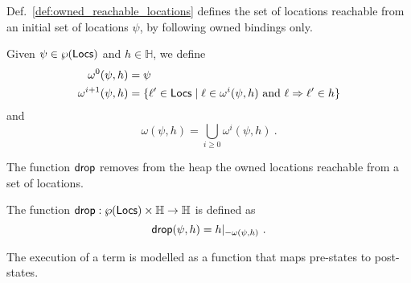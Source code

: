 Def.~\ref{def:owned_reachable_locations}
defines the set of locations reachable from an initial set of locations $\psi$,
by following owned bindings only.
%
\begin{definition}\label{def:owned_reachable_locations}
  Given $\psi\in\wp(\mathsf{Locs})$ and $h\in\mathbb{H}$, we define
  \begin{align*}
  \omega^0(\psi,h)&=\psi\\ %
  \omega^{i+1}(\psi,h)&=\{\ell'\in\Locs\mid\ell\in\omega^i(\psi,h)\text{ and }\ell\Rightarrow\ell'\in h\}
  \end{align*}
  and
  \[
  \omega(\psi,h)=\bigcup\limits_{i\ge 0}\omega^i(\psi,h)~.
  \]
\end{definition}

\noindent
The function $\mathsf{drop}$ removes from the heap the owned locations reachable from a set of locations.
%
\begin{definition}[Drop]\label{def:drop}
  The function $\mathsf{drop}:\wp(\mathsf{Locs})\times\mathbb{H}\to\mathbb{H}$ is defined as
  \[
  \mathsf{drop}(\psi,h)=h|_{-{\omega(\psi,h)}}~.
  \]
\end{definition}

The execution of a term is modelled as a function that
maps pre-states to post-states.

